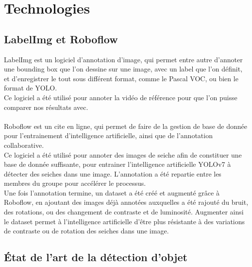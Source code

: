 \chapter{Technologies}

\section{LabelImg et Roboflow}
LabelImg est un logiciel d'annotation d'image, qui permet entre autre d'annoter une bounding box que l'on dessine sur une image, avec un label que l'on définit, et d'enregistrer le tout sous différent format, comme le Pascal VOC, ou bien le format de YOLO.\\
Ce logiciel a été utilisé pour annoter la vidéo de référence pour que l'on puisse comparer nos résultats avec.\\
\\
Roboflow est un cite en ligne, qui permet de faire de la gestion de base de donnée pour l'entrainement d'intelligence artificielle, ainsi que de l'annotation collaborative.\\
Ce logiciel a été utilisé pour annoter des images de seiche afin de constituer une base de donnée suffisante, pour entrainer l'intelligence artificielle YOLOv7\cite{wang_yolov7_nodate} à détecter des seiches dans une image. L'annotation a été repartie entre les membres du groupe pour accélérer le processus.\\
Une fois l'annotation termine, un dataset a été créé et augmenté grâce à Roboflow, en ajoutant des images déjà annotées auxquelles a été rajouté du bruit, des rotations, ou des changement de contraste et de luminosité. Augmenter ainsi le dataset permet à l'intelligence artificielle d'être plus résistante à des variations de contraste ou de rotation des seiches dans une image.\\




\section{État de l'art de la détection d'objet}

